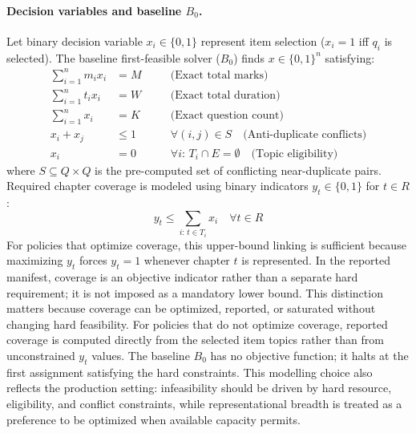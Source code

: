 \documentclass[runningheads]{llncs}
\begin{document}
\paragraph{Decision variables and baseline $B_0$.}
Let binary decision variable $x_i\in\{0,1\}$ represent item selection ($x_i=1$ iff $q_i$ is selected). The baseline first-feasible solver ($B_0$) finds $x\in\{0,1\}^n$ satisfying:
\begin{align}
\sum_{i=1}^n m_i x_i &= M \quad &&\text{(Exact total marks)} \label{eq:marks} \\
\sum_{i=1}^n t_i x_i &= W \quad &&\text{(Exact total duration)} \label{eq:time} \\
\sum_{i=1}^n x_i &= K \quad &&\text{(Exact question count)} \label{eq:count} \\
x_i + x_j &\le 1 && \forall (i,j)\in S \quad\text{(Anti-duplicate conflicts)} \label{eq:conflict} \\
x_i &= 0 && \forall i:\,T_i\cap E=\emptyset \quad\text{(Topic eligibility)} \label{eq:eligibility}
\end{align}
where $S\subseteq Q\times Q$ is the pre-computed set of conflicting near-duplicate pairs. Required chapter coverage is modeled using binary indicators $y_t\in\{0,1\}$ for $t\in R$:
\begin{equation}
y_t \le \sum_{i:\,t\in T_i} x_i \quad \forall t\in R \label{eq:coverage_link}
\end{equation}
For policies that optimize coverage, this upper-bound linking is sufficient because maximizing $y_t$ forces $y_t=1$ whenever chapter $t$ is represented. In the reported manifest, coverage is an objective indicator rather than a separate hard requirement; it is not imposed as a mandatory lower bound. This distinction matters because coverage can be optimized, reported, or saturated without changing hard feasibility. For policies that do not optimize coverage, reported coverage is computed directly from the selected item topics rather than from unconstrained $y_t$ values. The baseline $B_0$ has no objective function; it halts at the first assignment satisfying the hard constraints.
This modelling choice also reflects the production setting: infeasibility should be driven by hard resource, eligibility, and conflict constraints, while representational breadth is treated as a preference to be optimized when available capacity permits.
\end{document}
